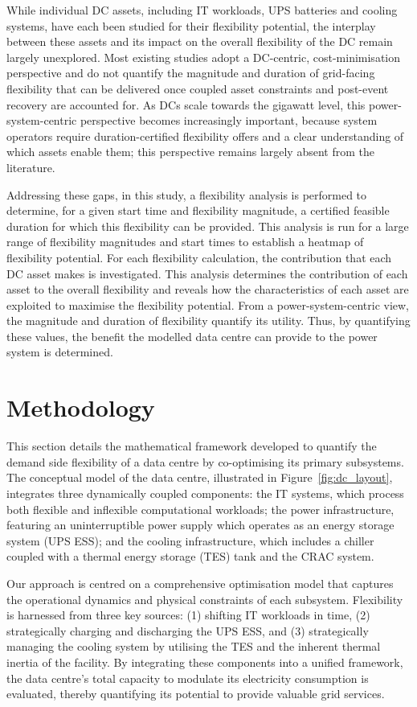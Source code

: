\documentclass[lettersize,journal]{IEEEtran}
\newcommand{\rev}[1]{#1}
\begin{document}
\rev{While individual DC assets, including IT workloads, UPS batteries and cooling systems, have each been studied for their flexibility potential, the interplay between these assets and its impact on the overall flexibility of the DC remain largely unexplored. Most existing studies adopt a DC-centric, cost-minimisation perspective and do not quantify the magnitude and duration of grid-facing flexibility that can be delivered once coupled asset constraints and post-event recovery are accounted for. As DCs scale towards the gigawatt level, this power-system-centric perspective becomes increasingly important, because system operators require duration-certified flexibility offers and a clear understanding of which assets enable them; this perspective remains largely absent from the literature.}

Addressing these gaps, in this study, a flexibility analysis is performed to determine, for a given start time and flexibility magnitude, a certified feasible duration for which this flexibility can be provided. This analysis is run for a large range of flexibility magnitudes and start times to establish a heatmap of flexibility potential. For each flexibility calculation, the contribution that each DC asset makes is investigated. This analysis determines the contribution of each asset to the overall flexibility and reveals how the characteristics of each asset are exploited to maximise the flexibility potential. From a power-system-centric view, the magnitude and duration of flexibility quantify its utility. Thus, by quantifying these values, the benefit the modelled data centre can provide to the power system is determined. 

\section{Methodology}
This section details the mathematical framework developed to quantify the demand side flexibility of a data centre by co-optimising its primary subsystems. The conceptual model of the data centre, illustrated in Figure~\ref{fig:dc_layout}, integrates three dynamically coupled components: the IT systems, which process both flexible and inflexible computational workloads; the power infrastructure, featuring an uninterruptible power supply which operates as an energy storage system (UPS ESS); and the cooling infrastructure, which includes a chiller coupled with a thermal energy storage (TES) tank and the CRAC system. 

Our approach is centred on a comprehensive optimisation model that captures the operational dynamics and physical constraints of each subsystem. Flexibility is harnessed from three key sources: (1) shifting IT workloads in time, (2) strategically charging and discharging the UPS ESS, and (3) strategically managing the cooling system by utilising the TES and the inherent thermal inertia of the facility. By integrating these components into a unified framework, the data centre's total capacity to modulate its electricity consumption is evaluated, thereby quantifying its potential to provide valuable grid services.
\end{document}
